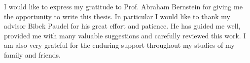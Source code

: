 \begin{acknowledgements}
I would like to express my gratitude to Prof. Abraham Bernstein for giving me the opportunity to write this thesis.
In particular I would like to thank my advisor Bibek Paudel for his great effort and patience.
He has guided me well, provided me with many valuable suggestions and carefully reviewed this work.
I am also very grateful for the enduring support throughout my studies of my family and friends.
\end{acknowledgements}
